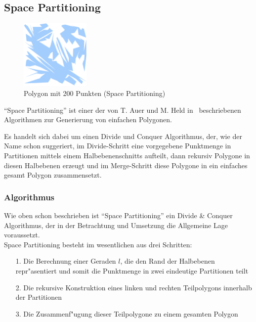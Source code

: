
\subsection{Space Partitioning}

  \begin{figure}[h]
    \begin{center}
      \includegraphics[width=0.3\textwidth]{img/spacepart200.eps}
    \end{center}
    \caption{Polygon mit 200 Punkten (Space Partitioning)}
    \label{fig:icb14}
  \end{figure}

  \enquote{Space Partitioning} ist einer der von T. Auer und M. Held 
  in~\cite{held98polygons} beschriebenen Algorithmen zur Generierung von
  einfachen Polygonen.


  Es handelt sich dabei um einen Divide und Conquer Algorithmus, der, wie der
  Name schon suggeriert, im Divide-Schritt eine vorgegebene Punktmenge in
  Partitionen mittels einem Halbebenenschnitts aufteilt, dann rekursiv Polygone
  in diesen Halbebenen erzeugt und im Merge-Schritt diese Polygone in ein
  einfaches gesamt Polygon zusammensetzt.

  \subsubsection{Algorithmus}

    Wie oben schon beschrieben ist \enquote{Space Partitioning} ein 
    Divide \& Conquer
    Algorithmus, der in der Betrachtung und Umsetzung die Allgemeine Lage
    voraussetzt. \\

    \noindent
    Space Partitioning besteht im wesentlichen aus drei Schritten:
    \begin{itemize}
      \item[1.] Die Berechnung einer Geraden $l$, die den Rand der Halbebenen 
            repr"asentiert und somit die Punktmenge in zwei eindeutige 
            Partitionen teilt
      \item[2.] Die rekursive Konstruktion eines linken und rechten 
            Teilpolygons innerhalb der Partitionen
      \item[3.] Die Zusammenf"ugung dieser Teilpolygone zu einem gesamten 
            Polygon
    \end{itemize}

